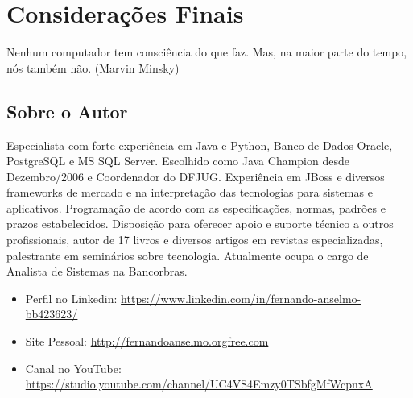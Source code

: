 \documentclass[a4paper,11pt]{book} %
\begin{document}

\pagestyle{empty} %
\tableofcontents %
\cleardoublepage %
\pagestyle{fancy} %
\clearpage %







% 
\appendix
\chapter{Considerações Finais}
\begin{remark}
Nenhum computador tem consciência do que faz. 
Mas, na maior parte do tempo, nós também não. (Marvin Minsky)
\end{remark}

\section{Sobre o Autor}
Especialista com forte experiência em Java e Python, Banco de Dados Oracle, PostgreSQL e MS SQL Server. Escolhido como Java Champion desde Dezembro/2006 e Coordenador do DFJUG. Experiência em JBoss e diversos frameworks de mercado e na interpretação das tecnologias para sistemas e aplicativos. Programação de acordo com as especificações, normas, padrões e prazos estabelecidos. Disposição para oferecer apoio e suporte técnico a outros profissionais, autor de 17 livros e diversos artigos em revistas especializadas, palestrante em seminários sobre tecnologia. Atualmente ocupa o cargo de Analista de Sistemas na Bancorbras.
\begin{itemize}
 \item Perfil no Linkedin: \url{https://www.linkedin.com/in/fernando-anselmo-bb423623/}
 \item Site Pessoal: \url{http://fernandoanselmo.orgfree.com}
 \item Canal no YouTube: \url{https://studio.youtube.com/channel/UC4VS4Emzy0TSbfgMfWcpnxA}
\end{itemize}
\end{document}
